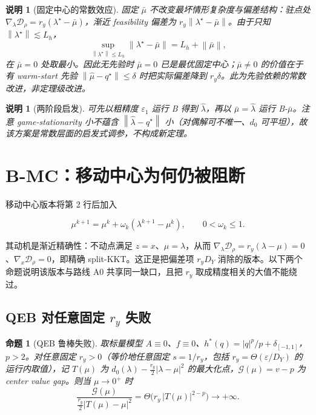 \documentclass[11pt,a4paper,UTF8]{ctexart}
\newtheorem{proposition}[theorem]{命题}
\newtheorem{remark}[theorem]{说明}
\newcommand{\D}{\mathcal D}
\newcommand{\G}{\mathcal G}
\newcommand{\eps}{\varepsilon}
\newcommand{\grad}{\nabla}
\newcommand{\norm}[1]{\left\|#1\right\|}
\begin{document}
\begin{remark}[固定中心的常数效应]\label{rem:constant}
固定 $\bar\mu$ 不改变最坏情形复杂度与偏差结构：驻点处 $\grad_\lambda\D_\rho=r_y(\lambda^\star-\bar\mu)$，渐近 feasibility 偏差为 $r_y\norm{\lambda^\star-\bar\mu}$。由于只知 $\norm{\lambda^\star}\lesssim L_h$，
$$
\sup_{\norm{\lambda^\star}\le L_h}\norm{\lambda^\star-\bar\mu}
=L_h+\norm{\bar\mu},
$$
在 $\bar\mu=0$ 处取最小。因此无先验时 $\bar\mu=0$ 已是最优固定中心；$\bar\mu\neq0$ 的价值在于有 warm-start 先验 $\norm{\hat\mu-q^\star}\le\delta$ 时把实际偏差降到 $r_y\delta$。此为先验依赖的常数改进，非定理级改进。
\end{remark}

\begin{remark}[两阶段启发]
可先以粗精度 $\eps_1$ 运行 B 得到 $\hat\lambda$，再以 $\bar\mu=\hat\lambda$ 运行 B-$\bar\mu$。注意 game-stationarity 小不蕴含 $\norm{\hat\lambda-q^\star}$ 小（对偶解可不唯一、$d_0$ 可平坦），故该方案是常数层面的启发式调参，不构成新定理。
\end{remark}

\section{B-MC：移动中心为何仍被阻断}

移动中心版本将第 2 行后加入

$$
\mu^{k+1}=\mu^k+\omega_k(\lambda^{k+1}-\mu^k),
\qquad 0<\omega_k\le1 .
$$

其动机是渐近精确性：不动点满足 $z=x$、$\mu=\lambda$，从而 $\grad_\lambda\D_\rho=r_y(\lambda-\mu)=0$、$\grad_x\D_\rho=0$，即精确 split-KKT。这正是把偏差项 $r_yD_Y$ 消除的版本。以下两个命题说明该版本与路线 A0 共享同一缺口，且把 $r_y$ 取成精度相关的大值不能绕过。

\subsection{QEB 对任意固定 \texorpdfstring{$r_y$}{ry} 失败}

\begin{proposition}[QEB 鲁棒失败]\label{prop:qeb}
取标量模型 $A\equiv0$、$f\equiv0$、$h^*(q)=|q|^p/p+\delta_{[-1,1]}$，$p>2$。对任意固定 $r_y>0$（等价地任意固定 $s=1/r_y$，包括 $r_y=\Theta(\eps/D_Y)$ 的运行内取值），记 $T(\mu)$ 为 $d_0(\lambda)-\frac{r_y}2|\lambda-\mu|^2$ 的最大化点，$\G(\mu)=v-p$ 为 center value gap。则当 $\mu\to0^+$ 时
$$
\frac{\G(\mu)}{\frac{r_y}2|T(\mu)-\mu|^2}
=\Theta\bigl(r_y\,|T(\mu)|^{2-p}\bigr)\longrightarrow+\infty .
$$
\end{proposition}
\end{document}
